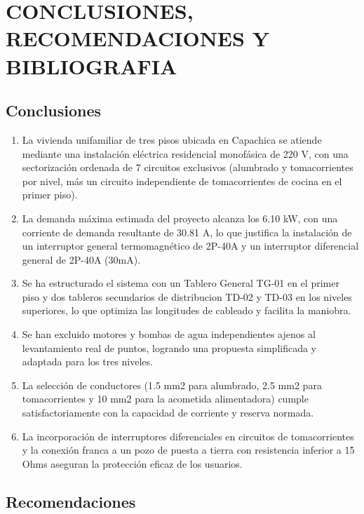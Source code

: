 \chapter{CONCLUSIONES, RECOMENDACIONES Y BIBLIOGRAFIA}

\section{Conclusiones}

\begin{enumerate}
  \item La vivienda unifamiliar de tres pisos ubicada en Capachica se atiende mediante una instalación eléctrica residencial monofásica de 220 V, con una sectorización ordenada de 7 circuitos exclusivos (alumbrado y tomacorrientes por nivel, más un circuito independiente de tomacorrientes de cocina en el primer piso).
  \item La demanda máxima estimada del proyecto alcanza los 6.10 kW, con una corriente de demanda resultante de 30.81 A, lo que justifica la instalación de un interruptor general termomagnético de 2P-40A y un interruptor diferencial general de 2P-40A (30mA).
  \item Se ha estructurado el sistema con un Tablero General TG-01 en el primer piso y dos tableros secundarios de distribucion TD-02 y TD-03 en los niveles superiores, lo que optimiza las longitudes de cableado y facilita la maniobra.
  \item Se han excluido motores y bombas de agua independientes ajenos al levantamiento real de puntos, logrando una propuesta simplificada y adaptada para los tres niveles.
  \item La selección de conductores (1.5 mm2 para alumbrado, 2.5 mm2 para tomacorrientes y 10 mm2 para la acometida alimentadora) cumple satisfactoriamente con la capacidad de corriente y reserva normada.
  \item La incorporación de interruptores diferenciales en circuitos de tomacorrientes y la conexión franca a un pozo de puesta a tierra con resistencia inferior a 15 Ohms aseguran la protección eficaz de los usuarios.
\end{enumerate}

\section{Recomendaciones}

